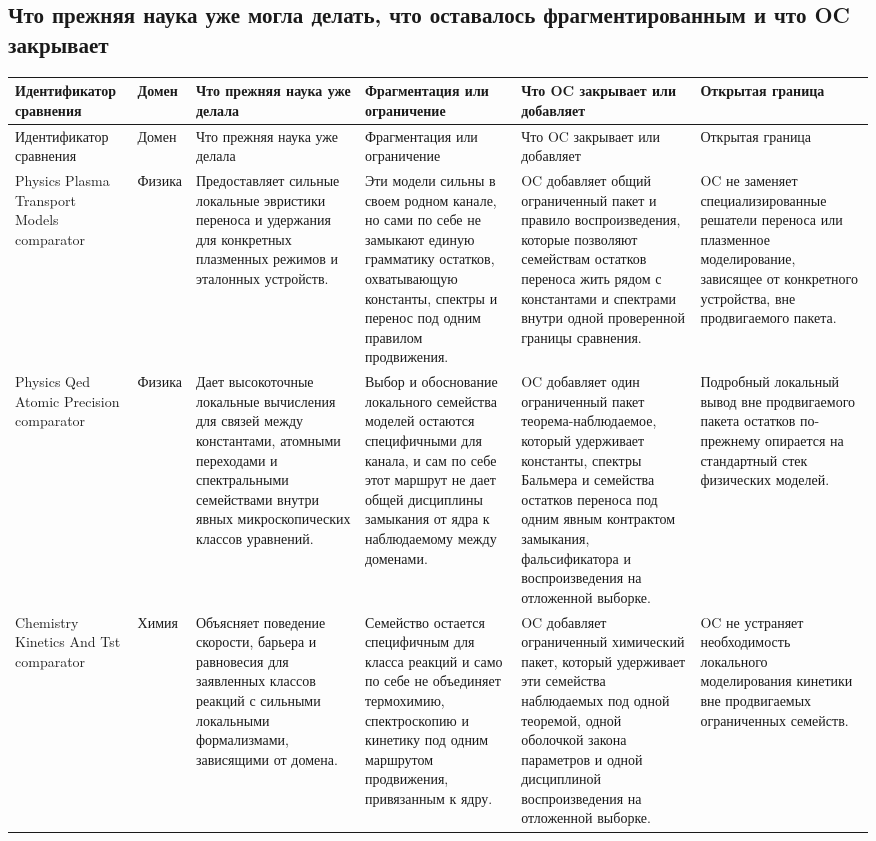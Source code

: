 \subsection{Что прежняя наука уже могла делать, что оставалось фрагментированным и что OC закрывает}
\begingroup
\scriptsize
\setlength{\emergencystretch}{1.5em}
\setlength{\tabcolsep}{2pt}
\setlength{\LTleft}{0pt}
\setlength{\LTright}{0pt}
\begin{longtable}{@{}L{0.17\textwidth}L{0.09\textwidth}L{0.17\textwidth}L{0.17\textwidth}L{0.20\textwidth}L{0.14\textwidth}@{}}
\toprule
Идентификатор сравнения & Домен & Что прежняя наука уже делала & Фрагментация или ограничение & Что OC закрывает или добавляет & Открытая граница \\
\midrule
\endfirsthead
\toprule
Идентификатор сравнения & Домен & Что прежняя наука уже делала & Фрагментация или ограничение & Что OC закрывает или добавляет & Открытая граница \\
\midrule
\endhead
Physics Plasma Transport Models comparator & Физика & Предоставляет сильные локальные эвристики переноса и удержания для конкретных плазменных режимов и эталонных устройств. & Эти модели сильны в своем родном канале, но сами по себе не замыкают единую грамматику остатков, охватывающую константы, спектры и перенос под одним правилом продвижения. & OC добавляет общий ограниченный пакет и правило воспроизведения, которые позволяют семействам остатков переноса жить рядом с константами и спектрами внутри одной проверенной границы сравнения. & OC не заменяет специализированные решатели переноса или плазменное моделирование, зависящее от конкретного устройства, вне продвигаемого пакета. \\
Physics Qed Atomic Precision comparator & Физика & Дает высокоточные локальные вычисления для связей между константами, атомными переходами и спектральными семействами внутри явных микроскопических классов уравнений. & Выбор и обоснование локального семейства моделей остаются специфичными для канала, и сам по себе этот маршрут не дает общей дисциплины замыкания от ядра к наблюдаемому между доменами. & OC добавляет один ограниченный пакет теорема-наблюдаемое, который удерживает константы, спектры Бальмера и семейства остатков переноса под одним явным контрактом замыкания, фальсификатора и воспроизведения на отложенной выборке. & Подробный локальный вывод вне продвигаемого пакета остатков по-прежнему опирается на стандартный стек физических моделей. \\
Chemistry Kinetics And Tst comparator & Химия & Объясняет поведение скорости, барьера и равновесия для заявленных классов реакций с сильными локальными формализмами, зависящими от домена. & Семейство остается специфичным для класса реакций и само по себе не объединяет термохимию, спектроскопию и кинетику под одним маршрутом продвижения, привязанным к ядру. & OC добавляет ограниченный химический пакет, который удерживает эти семейства наблюдаемых под одной теоремой, одной оболочкой закона параметров и одной дисциплиной воспроизведения на отложенной выборке. & OC не устраняет необходимость локального моделирования кинетики вне продвигаемых ограниченных семейств. \\

\end{longtable}

